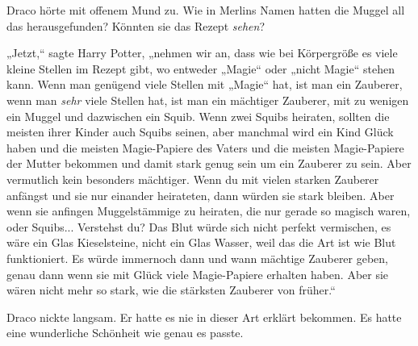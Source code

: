 {Draco hörte mit offenem Mund zu. Wie in Merlins Namen hatten die Muggel all das herausgefunden? Könnten sie das Rezept \emph{sehen}?

„Jetzt,“ sagte Harry Potter, „nehmen wir an, dass wie bei Körpergröße es viele kleine Stellen im Rezept gibt, wo entweder „Magie“ oder „nicht Magie“ stehen kann. Wenn man genügend viele Stellen mit „Magie“ hat, ist man ein Zauberer, wenn man \emph{sehr} viele Stellen hat, ist man ein mächtiger Zauberer, mit zu wenigen ein Muggel und dazwischen ein Squib. Wenn zwei Squibs heiraten, sollten die meisten ihrer Kinder auch Squibs seinen, aber manchmal wird ein Kind Glück haben und die meisten Magie-Papiere des Vaters und die meisten Magie-Papiere der Mutter bekommen und damit stark genug sein um ein Zauberer zu sein. Aber vermutlich kein besonders mächtiger. Wenn du mit vielen starken Zauberer anfängst und sie nur einander heirateten, dann würden sie stark bleiben. Aber wenn sie anfingen Muggelstämmige zu heiraten, die nur gerade so magisch waren, oder Squibs... Verstehst du? Das Blut würde sich nicht perfekt vermischen, es wäre ein Glas Kieselsteine, nicht ein Glas Wasser, weil das die Art ist wie Blut funktioniert. Es würde immernoch dann und wann mächtige Zauberer geben, genau dann wenn sie mit Glück viele Magie-Papiere erhalten haben. Aber sie wären nicht mehr so stark, wie die stärksten Zauberer von früher.“

Draco nickte langsam. Er hatte es nie in dieser Art erklärt bekommen. Es hatte eine wunderliche Schönheit wie genau es passte.

}
